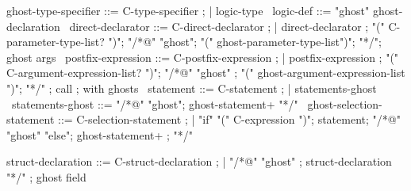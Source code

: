 \begin{syntax}

  ghost-type-specifier ::= C-type-specifier ;
  | {logic-type} \
  logic-def ::= "ghost" ghost-declaration \
  direct-declarator ::= C-direct-declarator ;
    | direct-declarator ;
    "(" C-parameter-type-list? ")";
        "/*@" "ghost";
          "(" ghost-parameter-type-list")";
          "*/"; ghost args
        \
  postfix-expression ::= C-postfix-expression ;
    | postfix-expression ;
     "(" C-argument-expression-list? ")";
     "/*@" "ghost" ;
       "(" ghost-argument-expression-list ")";
       "*/" ; call
              ; with ghosts
    \
  statement ::= C-statement ;
             | statements-ghost \
  statements-ghost ::= "/*@" "ghost";
                       ghost-statement+ "*/" \
  ghost-selection-statement ::= C-selection-statement ;
    | "if" "(" C-expression ")";
       statement;
      "/*@" "ghost" "else";
        ghost-statement+ ;
        "*/" \

  struct-declaration ::= C-struct-declaration ;
  | {"/*@" "ghost" };
    { struct-declaration "*/"} ; ghost field

\end{syntax}

